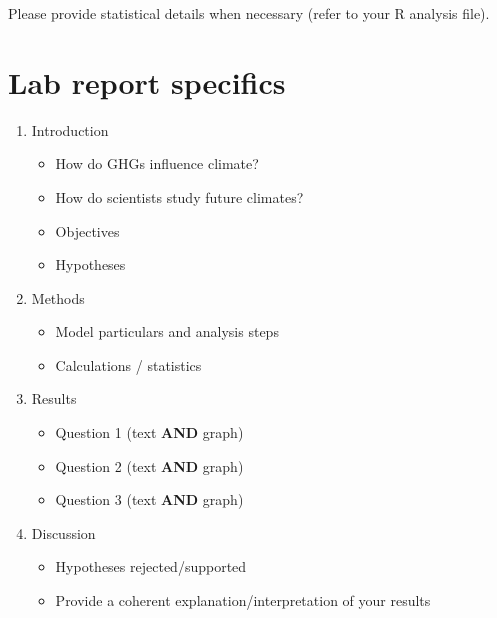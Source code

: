 \documentclass[11pt,]{article}
\providecommand{\tightlist}{%
\setlength{\itemsep}{0pt}\setlength{\parskip}{0pt}}
\begin{document}
Please provide statistical details when necessary (refer to your R
analysis file).

\pagebreak

\section{Lab report specifics}\label{lab-report-specifics}

\begin{enumerate}
\def\labelenumi{\arabic{enumi}.}
\tightlist
\item
  Introduction

  \begin{itemize}
  \tightlist
  \item
    How do GHGs influence climate?
  \item
    How do scientists study future climates?
  \item
    Objectives
  \item
    Hypotheses
  \end{itemize}
\item
  Methods

  \begin{itemize}
  \tightlist
  \item
    Model particulars and analysis steps
  \item
    Calculations / statistics
  \end{itemize}
\item
  Results

  \begin{itemize}
  \tightlist
  \item
    Question 1 (text \textbf{AND} graph)
  \item
    Question 2 (text \textbf{AND} graph)
  \item
    Question 3 (text \textbf{AND} graph)
  \end{itemize}
\item
  Discussion

  \begin{itemize}
  \tightlist
  \item
    Hypotheses rejected/supported
  \item
    Provide a coherent explanation/interpretation of your results
  \end{itemize}
\end{enumerate}




\newpage
\singlespacing 
\end{document}
